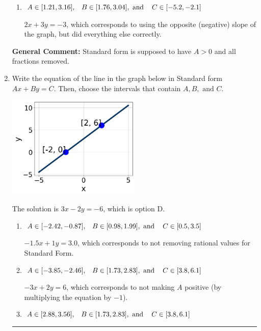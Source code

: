 \documentclass{extbook}[14pt]
\newcommand{\litem}[1]{\item #1

\rule{\textwidth}{0.4pt}}
\begin{document}
\begin{enumerate}
{\begin{enumerate}[label=\Alph*.]
* $2x - 3y = 3$, which is the correct option.
\item \( A \in [1.21, 3.16], \hspace{3mm} B \in [1.76, 3.04], \text{ and } \hspace{3mm} C \in [-5.2, -2.1] \)

 $2x + 3y = -3$, which corresponds to using the opposite (negative) slope of the graph, but did everything else correctly.
\end{enumerate}

\textbf{General Comment:} Standard form is supposed to have $A > 0$ and all fractions removed.
}
\litem{
Write the equation of the line in the graph below in Standard form $Ax+By=C$. Then, choose the intervals that contain $A, B, \text{ and } C$.

\begin{center}
    \includegraphics[width=0.5\textwidth]{../Figures/linearGraphToStandardB.png}
\end{center}


The solution is \( 3x - 2y = -6 \), which is option D.\begin{enumerate}[label=\Alph*.]
\item \( A \in [-2.42, -0.87], \hspace{3mm} B \in [0.98, 1.99], \text{ and } \hspace{3mm} C \in [0.5, 3.5] \)

 $-1.5x + 1y = 3.0$, which corresponds to not removing rational values for Standard Form.
\item \( A \in [-3.85, -2.46], \hspace{3mm} B \in [1.73, 2.83], \text{ and } \hspace{3mm} C \in [3.8, 6.1] \)

 $-3x + 2y = 6$, which corresponds to not making $A$ positive (by multiplying the equation by $-1$).
\item \( A \in [2.88, 3.56], \hspace{3mm} B \in [1.73, 2.83], \text{ and } \hspace{3mm} C \in [3.8, 6.1] \)


\end{enumerate}}
\end{enumerate}
\end{document}
